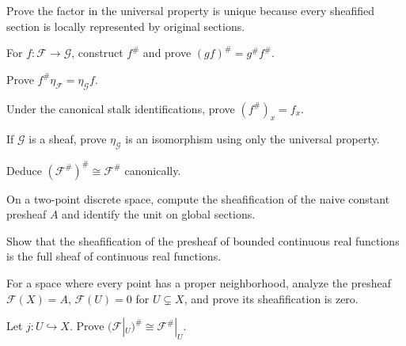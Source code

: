\begin{exercise}
Prove the factor in the universal property is unique because every sheafified section is locally represented by original sections.
\end{exercise}

\begin{exercise}[Functoriality]
For $f:\mathcal F\to\mathcal G$, construct $f^\#$ and prove $(gf)^\#=g^\#f^\#$.
\end{exercise}

\begin{exercise}
Prove $f^\#\eta_\mathcal F=\eta_\mathcal Gf$.
\end{exercise}

\begin{exercise}
Under the canonical stalk identifications, prove $(f^\#)_x=f_x$.
\end{exercise}

\begin{exercise}
If $\mathcal G$ is a sheaf, prove $\eta_\mathcal G$ is an isomorphism using only the universal property.
\end{exercise}

\begin{exercise}[Idempotence]
Deduce $(\mathcal F^\#)^\#\cong\mathcal F^\#$ canonically.
\end{exercise}

\begin{exercise}
On a two-point discrete space, compute the sheafification of the naive constant presheaf $A$ and identify the unit on global sections.
\end{exercise}

\begin{exercise}
Show that the sheafification of the presheaf of bounded continuous real functions is the full sheaf of continuous real functions.
\end{exercise}

\begin{exercise}
For a space where every point has a proper neighborhood, analyze the presheaf $\mathcal F(X)=A$, $\mathcal F(U)=0$ for $U\subsetneq X$, and prove its sheafification is zero.
\end{exercise}

\begin{exercise}
Let $j:U\hookrightarrow X$. Prove $(\mathcal F|_U)^\#\cong\mathcal F^\#|_U$.
\end{exercise}

